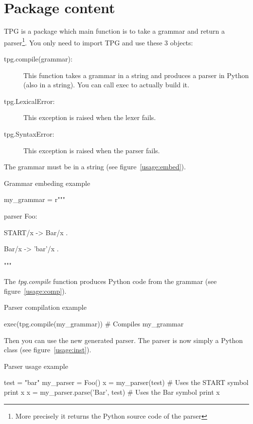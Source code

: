 \section{Package content}

TPG is a package which main function is to take a grammar and return a parser\footnote{More precisely it returns the Python source code of the parser}.
You only need to import TPG and use these 3 objects:

\begin{description}
	\item [tpg.compile(grammar):]
		This function takes a grammar in a string and produces
		a parser in Python (also in a string).
		You can call exec to actually build it. 
	\item [tpg.LexicalError:]
		This exception is raised when the lexer fails.
	\item [tpg.SyntaxError:]
		This exception is raised when the parser fails.
\end{description}

The grammar must be in a string (see figure~\ref{usage:embed}).

\begin{code}
\caption{Grammar embeding example} \label{usage:embed}
\begin{verbatimtab}[4]
	my_grammar = r"""

	parser Foo:

		START/x -> Bar/x .

		Bar/x -> 'bar'/x .

	"""
\end{verbatimtab}
\end{code}

The \emph{tpg.compile} function produces Python code from the grammar (see figure~\ref{usage:comp}).

\begin{code}
\caption{Parser compilation example} \label{usage:comp}
\begin{verbatimtab}[4]
	exec(tpg.compile(my_grammar))    # Compiles my_grammar
\end{verbatimtab}
\end{code}

Then you can use the new generated parser. The parser is now simply a Python class (see figure~\ref{usage:inst}).

\begin{code}
\caption{Parser usage example} \label{usage:inst}
\begin{verbatimtab}[4]
	test = "bar"
	my_parser = Foo()
	x = my_parser(test)               # Uses the START symbol
	print x
	x = my_parser.parse('Bar', test)  # Uses the Bar symbol
	print x
\end{verbatimtab}
\end{code}

